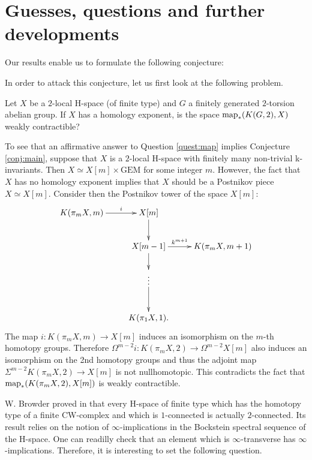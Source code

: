 \section{Guesses, questions and further developments}\label{section:conjectures}

Our results enable us to formulate the following conjecture:

\begin{conj}\label{conj:main}
\label{conj_main}

\end{conj}
\theoremstyle{plain}
\newtheorem*{conj_main}{\mbox{\ref{conj_main}.~Conjecture}}

In order to attack this conjecture, let us first look at the following problem.

\begin{quest}\label{quest:map}
Let $X$ be a $2$-local H-space (of finite type) and $G$ a finitely generated $2$-torsion abelian group. If $X$ has a homology exponent, is the space $\operatorname{map}_*(K(G,2),X)$ weakly contractible?
\end{quest}

To see that an affirmative answer to Question \ref{quest:map} implies Conjecture \ref{conj:main}, suppose that $X$ is a $2$-local H-space with finitely many non-trivial k-invariants. Then $X\simeq X[m]\times\text{GEM}$ for some integer $m$. However, the fact that $X$ has no homology exponent implies that $X$ should be a Postnikov piece $X\simeq X[m]$. Consider then the Postnikov tower of the space $X[m]$:
$$\xymatrix{
K(\pi_mX,m)\ar[r]^-i &X[m]\ar[d]\\
&X[m-1]\ar[d]\ar[r]^-{k^{m+1}} &K(\pi_mX,m+1)\\
&\vdots\ar[d]\\
&K(\pi_1X,1).
}$$ The map $i:K(\pi_m X,m)\to X[m]$ induces an isomorphism on the $m$-th homotopy groups. Therefore $\Omega^{m-2}i:K(\pi_m X,2)\to\Omega^{m-2}X[m]$ also induces an isomorphism on the 2nd homotopy groups and thus the adjoint map $\Sigma^{m-2}K(\pi_m X,2)\to X[m]$ is not nullhomotopic. This contradicts the fact that $\operatorname{map}_*(K(\pi_mX,2),X[m])$ is weakly contractible.

\bigskip
W. Browder proved in \cite[Theorem 6.11, p. 46]{Br61} that every H-space of finite type which has the homotopy type of a finite CW-complex and which is $1$-connected is actually $2$-connected. Its result relies on the notion of $\infty$-implications in the Bockstein spectral sequence of the H-space. One can readilly check that an element which is $\infty$-transverse has $\infty$-implications. Therefore, it is interesting to set the following question. 

